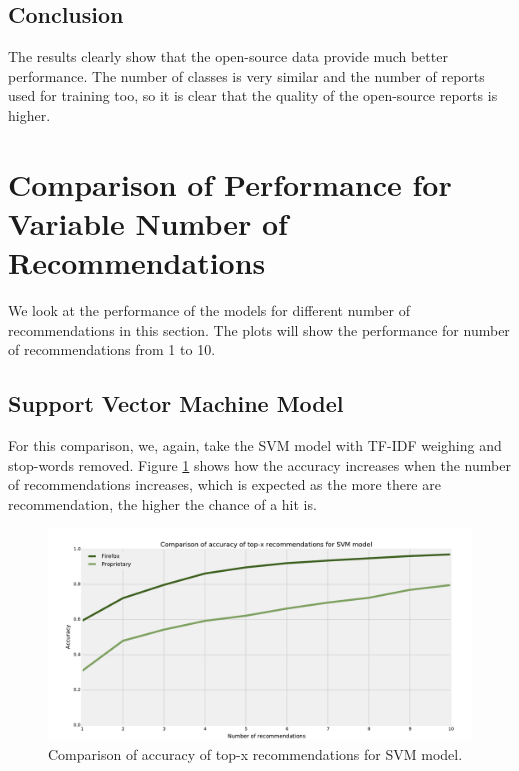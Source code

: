 \subsection{Conclusion}

The results clearly show that the open-source data provide much better performance. The number of classes is very similar and the number of reports used for training too, so it is clear that the quality of the open-source reports is higher.

\section{Comparison of Performance for Variable Number of Recommendations}
\label{section:compare-number-of-recommendations}

We look at the performance of the models for different number of recommendations in this section. The plots will show the performance for number of recommendations from 1 to 10.

\subsection{Support Vector Machine Model}

For this comparison, we, again, take the SVM model with TF-IDF weighing and stop-words removed. Figure \ref{fig:results.topx.svm_accuracy} shows how the accuracy increases when the number of recommendations increases, which is expected as the more there are recommendation, the higher the chance of a hit is.

\begin{figure}[htbp]
    \centering
        \includegraphics[width=\textwidth]{./images/top_x_comparison/svm_accuracy.pdf}
    \caption{Comparison of accuracy of top-x recommendations for SVM model.}
    \label{fig:results.topx.svm_accuracy}
\end{figure}

